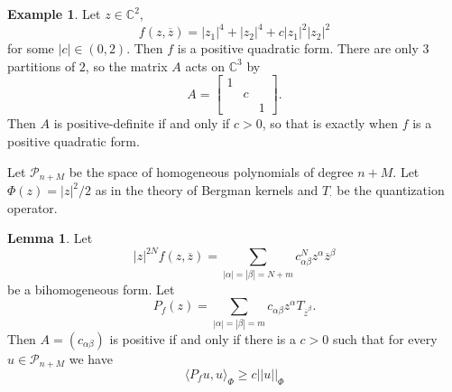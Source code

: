 \documentclass[12pt]{report}
\newcommand{\CC}{\mathbb{C}}
\theoremstyle{definition}
\newtheorem{lemma}[theorem]{Lemma}
\newtheorem{example}[theorem]{Example}
\begin{document}
\begin{example}
    Let $z \in \CC^2$,
    $$f(z, \overline z) = |z_1|^4 + |z_2|^4 + c|z_1|^2 |z_2|^2$$
    for some $|c| \in (0, 2)$. Then $f$ is a positive quadratic form. There are only $3$ partitions of $2$, so the matrix $A$ acts on $\CC^3$ by
    $$A = \begin{bmatrix}
        1 &&\\&c&\\&&1
    \end{bmatrix}.$$
    Then $A$ is positive-definite if and only if $c > 0$, so that is exactly when $f$ is a positive quadratic form.
\end{example}
    Let $\mathcal P_{n + M}$ be the space of homogeneous polynomials of degree $n + M$. Let $\Phi(z) = |z|^2/2$ as in the theory of Bergman kernels and $T_\cdot$ be the quantization operator.
\begin{lemma}
    Let
    $$|z|^{2N} f(z, \overline z) = \sum_{|\alpha| = |\beta| = N + m} c_{\alpha\beta}^N z^\alpha \overline z^\beta$$
    be a bihomogeneous form. Let
    $$P_f(z) = \sum_{|\alpha| = |\beta| = m} c_{\alpha\beta}z^\alpha T_{\overline z^\beta}.$$
    Then $A = (c_{\alpha\beta})$ is positive if and only if there is a $c > 0$ such that for every $u \in \mathcal P_{n + M}$ we have
    $$\langle P_f u, u\rangle_\Phi \geq c||u||_\Phi$$
\end{lemma}
\end{document}

